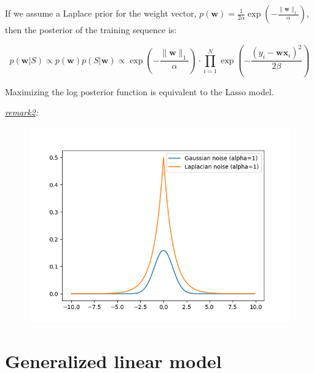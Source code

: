 \documentclass{article}
\begin{document}
	If we assume a Laplace prior for the weight vector, $p(\mathbf{w})=\frac{1}{2\alpha} \exp \left( -\frac{\|\mathbf{w}\|_1}{\alpha} \right)$, then the posterior of the training sequence is:
	
	\begin{equation}
	p(\mathbf{w}|S) \propto p(\mathbf{w}) p(S|\mathbf{w}) \propto \exp \left( -\frac{\|\mathbf{w}\|_1}{\alpha} \right) \cdot \prod_{i=1}^N \exp \left( -\frac{(y_i-\mathbf{wx}_i)^2}{2\beta} \right)
	\end{equation}

Maximizing the log posterior function is equivalent to the Lasso model.

	\textit{\underline{remark2}: }
	\begin{figure}[!htbp]
	\begin{center}
	\includegraphics[scale=.4]{C4-1.png}	
	\end{center}
	\end{figure}

\section{Generalized linear model}
\end{document}
